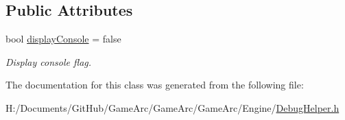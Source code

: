 \subsection*{Public Attributes}
\begin{DoxyCompactItemize}
\item 
\hypertarget{class_debug_helper_a4353de086099b07a758df1ce5f44bed7}{bool \hyperlink{class_debug_helper_a4353de086099b07a758df1ce5f44bed7}{display\+Console} = false}\label{class_debug_helper_a4353de086099b07a758df1ce5f44bed7}

\begin{DoxyCompactList}\small\item\em Display console flag. \end{DoxyCompactList}\end{DoxyCompactItemize}


The documentation for this class was generated from the following file\+:\begin{DoxyCompactItemize}
\item 
H\+:/\+Documents/\+Git\+Hub/\+Game\+Arc/\+Game\+Arc/\+Game\+Arc/\+Engine/\hyperlink{_debug_helper_8h}{Debug\+Helper.\+h}\end{DoxyCompactItemize}

